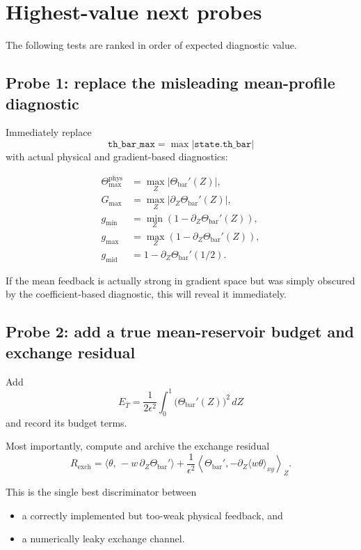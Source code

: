\documentclass[11pt]{article}
\begin{document}
\section{Highest-value next probes}

The following tests are ranked in order of expected diagnostic value.

\subsection{Probe 1: replace the misleading mean-profile diagnostic}

Immediately replace
\[
\texttt{th\_bar\_max}
=
\max |\texttt{state.th\_bar}|
\]
with actual physical and gradient-based diagnostics:

\begin{align*}
\Theta_{\max}^{\mathrm{phys}}
&=
\max_Z |\Theta_{\mathrm{bar}}'(Z)|, \\
G_{\max}
&=
\max_Z |\partial_Z\Theta_{\mathrm{bar}}'(Z)|, \\
g_{\min}
&=
\min_Z \left(1-\partial_Z\Theta_{\mathrm{bar}}'(Z)\right), \\
g_{\max}
&=
\max_Z \left(1-\partial_Z\Theta_{\mathrm{bar}}'(Z)\right), \\
g_{\mathrm{mid}}
&=
1-\partial_Z\Theta_{\mathrm{bar}}'(1/2).
\end{align*}

If the mean feedback is actually strong in gradient space but was simply obscured by the coefficient-based diagnostic, this will reveal it immediately.

\subsection{Probe 2: add a true mean-reservoir budget and exchange residual}

Add
\[
E_{\bar T}
=
\frac{1}{2\epsilon^2}\int_0^1 \bigl(\Theta_{\mathrm{bar}}'(Z)\bigr)^2\,dZ
\]
and record its budget terms.

Most importantly, compute and archive the exchange residual
\[
R_{\mathrm{exch}}
=
\langle \theta,\,-w\,\partial_Z\Theta_{\mathrm{bar}}' \rangle
+
\frac{1}{\epsilon^2}
\left\langle
\Theta_{\mathrm{bar}}',
-\partial_Z\langle w\theta\rangle_{xy}
\right\rangle_Z.
\]

This is the single best discriminator between
\begin{itemize}
\item a correctly implemented but too-weak physical feedback, and
\item a numerically leaky exchange channel.
\end{itemize}
\end{document}
